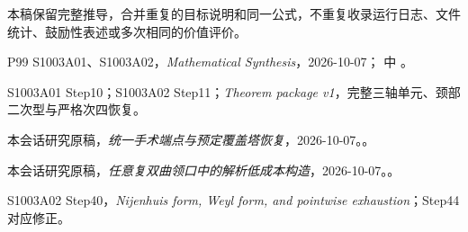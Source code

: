 \documentclass[UTF8,11pt,fontset=none]{ctexart}
\begin{document}
本稿保留完整推导，合并重复的目标说明和同一公式，不重复收录运行日志、文件统计、鼓励性表述或多次相同的价值评价。

\begin{thebibliography}{P99}
\small
{} S1003A01、S1003A02，\emph{Mathematical Synthesis}，2026-10-07； 中 。

 S1003A01 Step10；S1003A02 Step11；\emph{Theorem package v1}，完整三轴单元、颈部二次型与严格次四恢复。

 本会话研究原稿，\emph{统一手术端点与预定覆盖塔恢复}，2026-10-07。。

 本会话研究原稿，\emph{任意复双曲领口中的解析低成本构造}，2026-10-07。。

 S1003A02 Step40，\emph{Nijenhuis form, Weyl form, and pointwise exhaustion}；Step44 对应修正。

\end{thebibliography}
\end{document}
